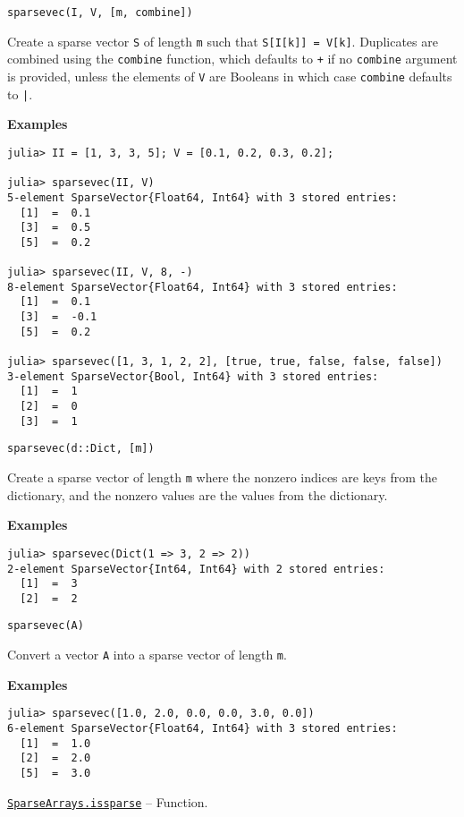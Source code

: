 \begin{adjustwidth}{2em}{0pt}


\begin{verbatim}
sparsevec(I, V, [m, combine])
\end{verbatim}

Create a sparse vector \texttt{S} of length \texttt{m} such that \texttt{S[I[k]] = V[k]}. Duplicates are combined using the \texttt{combine} function, which defaults to \texttt{+} if no \texttt{combine} argument is provided, unless the elements of \texttt{V} are Booleans in which case \texttt{combine} defaults to \texttt{|}.

\textbf{Examples}


\begin{verbatim}
julia> II = [1, 3, 3, 5]; V = [0.1, 0.2, 0.3, 0.2];

julia> sparsevec(II, V)
5-element SparseVector{Float64, Int64} with 3 stored entries:
  [1]  =  0.1
  [3]  =  0.5
  [5]  =  0.2

julia> sparsevec(II, V, 8, -)
8-element SparseVector{Float64, Int64} with 3 stored entries:
  [1]  =  0.1
  [3]  =  -0.1
  [5]  =  0.2

julia> sparsevec([1, 3, 1, 2, 2], [true, true, false, false, false])
3-element SparseVector{Bool, Int64} with 3 stored entries:
  [1]  =  1
  [2]  =  0
  [3]  =  1
\end{verbatim}




\begin{lstlisting}
sparsevec(d::Dict, [m])
\end{lstlisting}

Create a sparse vector of length \texttt{m} where the nonzero indices are keys from the dictionary, and the nonzero values are the values from the dictionary.

\textbf{Examples}


\begin{verbatim}
julia> sparsevec(Dict(1 => 3, 2 => 2))
2-element SparseVector{Int64, Int64} with 2 stored entries:
  [1]  =  3
  [2]  =  2
\end{verbatim}




\begin{lstlisting}
sparsevec(A)
\end{lstlisting}

Convert a vector \texttt{A} into a sparse vector of length \texttt{m}.

\textbf{Examples}


\begin{verbatim}
julia> sparsevec([1.0, 2.0, 0.0, 0.0, 3.0, 0.0])
6-element SparseVector{Float64, Int64} with 3 stored entries:
  [1]  =  1.0
  [2]  =  2.0
  [5]  =  3.0
\end{verbatim}



\end{adjustwidth}
\hypertarget{14062776301471954766}{}
\hyperlink{14062776301471954766}{\texttt{SparseArrays.issparse}}  -- {Function.}

